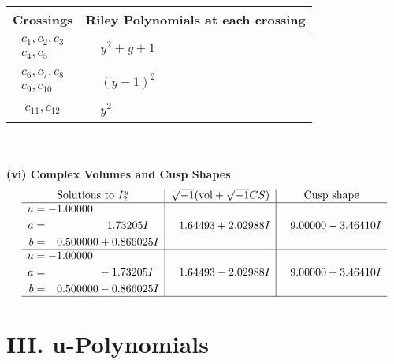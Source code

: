 \documentclass[1p]{elsarticle_modified}
\theoremstyle{definition}
\newcommand{\I}{\sqrt{-1}}
\begin{document}
\begin{tabular}{m{50pt}|m{274pt}}
Crossings & \hspace{64pt}Riley Polynomials at each crossing \\
\hline $$\begin{aligned}c_{1},c_{2},c_{3}\\c_{4},c_{5}\end{aligned}$$&$\begin{aligned}
&y^2+y+1
\end{aligned}$\\
\hline $$\begin{aligned}c_{6},c_{7},c_{8}\\c_{9},c_{10}\end{aligned}$$&$\begin{aligned}
&(y-1)^2
\end{aligned}$\\
\hline $$\begin{aligned}c_{11},c_{12}\end{aligned}$$&$\begin{aligned}
&y^2
\end{aligned}$\\
\hline
\end{tabular}\\~\\
\newpage\flushleft \textbf{(vi) Complex Volumes and Cusp Shapes}
$$\begin{array}{c|c|c}  
\text{Solutions to }I^u_{2}& \I (\text{vol} + \sqrt{-1}CS) & \text{Cusp shape}\\
 \hline 
\begin{aligned}
u &= -1.00000\phantom{ +0.000000I} \\
a &= \phantom{-0.000000 -}1.73205 I \\
b &= \phantom{-}0.500000 + 0.866025 I\end{aligned}
 & \phantom{-}1.64493 + 2.02988 I & \phantom{-}9.00000 - 3.46410 I \\ \hline\begin{aligned}
u &= -1.00000\phantom{ +0.000000I} \\
a &= \phantom{-0.000000 } -1.73205 I \\
b &= \phantom{-}0.500000 - 0.866025 I\end{aligned}
 & \phantom{-}1.64493 - 2.02988 I & \phantom{-}9.00000 + 3.46410 I\\
 \hline 
 \end{array}$$\newpage
\newpage\renewcommand{\arraystretch}{1}
\centering \section*{ III. u-Polynomials}
\end{document}
